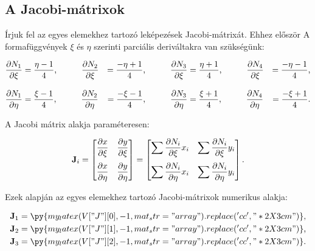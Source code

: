 \subsection{A Jacobi-mátrixok}

Írjuk fel az egyes elemekhez tartozó leképezések Jacobi-mátrixát. Ehhez először
A formafüggvények $\xi$ és $\eta$ szerinti parciális deriváltakra van szükségünk:
\begin{myframe}
  \begin{alignat}{9}
    \pdv{N_1}{\xi}  & = \frac{\eta - 1}{4}
    \text, \qquad \quad
    \pdv{N_2}{\xi}  & = \frac{-\eta + 1}{4}
    \text, \qquad \quad
    \pdv{N_3}{\xi}  & = \frac{\eta + 1}{4}
    \text, \qquad \quad
    \pdv{N_4}{\xi}  & = \frac{-\eta - 1}{4}
    \text,                                  \\[3mm]
    \pdv{N_1}{\eta} & = \frac{\xi - 1}{4}
    \text, \qquad \quad
    \pdv{N_2}{\eta} & = \frac{-\xi - 1}{4}
    \text, \qquad \quad
    \pdv{N_3}{\eta} & = \frac{\xi + 1}{4}
    \text, \qquad \quad
    \pdv{N_4}{\eta} & = \frac{-\xi + 1}{4}
    \text.
  \end{alignat}
\end{myframe}
A Jacobi mátrix alakja paraméteresen:
\begin{myframe}
  \begin{equation}
    \mathbf{J}_i = \begin{bmatrix}
      \displaystyle \pdv{x}{\xi}  &
      \displaystyle \pdv{y}{\xi}    \\[4mm]
      \displaystyle \pdv{x}{\eta} &
      \displaystyle \pdv{y}{\eta}   \\
    \end{bmatrix} = \begin{bmatrix}
      \displaystyle \sum \pdv{N_i}{\xi} x_i  &
      \displaystyle \sum \pdv{N_i}{\xi} y_i    \\[4mm]
      \displaystyle \sum \pdv{N_i}{\eta} x_i &
      \displaystyle \sum \pdv{N_i}{\eta} y_i   \\
    \end{bmatrix}
    \text.
  \end{equation}
\end{myframe}
Ezek alapján az egyes elemekhez tartozó Jacobi-mátrixok numerikus alakja:
\begin{myframe}
  \begin{align}
    \rmat J_1 & =
    \py{my_latex(V["J"][0], -1, mat_str="array").replace('cc', "*{2}{X{3cm}}")}
    \text,
    \\
    \rmat J_2 & =
    \py{my_latex(V["J"][1], -1, mat_str="array").replace('cc', "*{2}{X{3cm}}")}
    \text,
    \\
    \rmat J_3 & =
    \py{my_latex(V["J"][2], -1, mat_str="array").replace('cc', "*{2}{X{3cm}}")}
    \text.
  \end{align}
\end{myframe}
